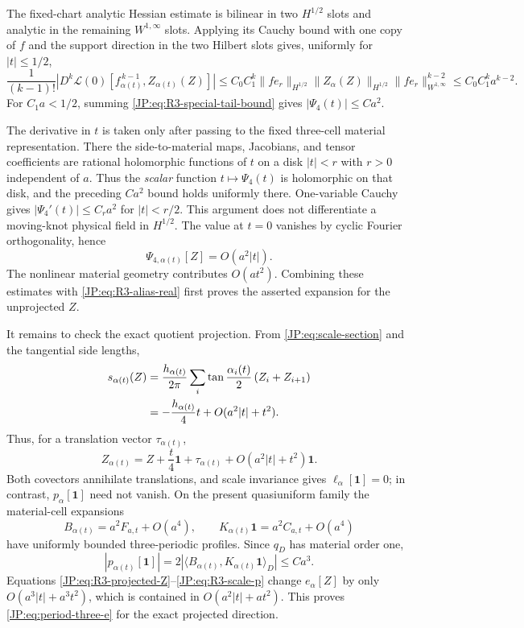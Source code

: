 \documentclass[11pt]{amsart}
\numberwithin{equation}{section}
\theoremstyle{definition}
\theoremstyle{remark}
\begin{document}
The fixed-chart analytic Hessian estimate is bilinear in two
$H^{1/2}$ slots and analytic in the remaining
$W^{1,\infty}$ slots.  Applying its Cauchy bound with one copy of $f$
and the support direction in the two Hilbert slots gives, uniformly for
$|t|\le1/2$,
\begin{equation}\label{JP:eq:R3-special-tail-bound}
 \frac1{(k-1)!}
 \left|D^k\mathcal L(0)
 [f_{\alpha(t)}^{\,k-1},Z_{\alpha(t)}(Z)]\right|
 \le C_0C_1^k
 \|f e_r\|_{H^{1/2}}\|Z_\alpha(Z)\|_{H^{1/2}}
 \|f e_r\|_{W^{1,\infty}}^{k-2}
 \le C_0C_1^k a^{k-2}.
\end{equation}
For $C_1a<1/2$, summing \eqref{JP:eq:R3-special-tail-bound} gives
$|\Psi_4(t)|\le Ca^2$.

The derivative in $t$ is taken only after passing to the fixed
three-cell material representation.  There the side-to-material maps,
Jacobians, and tensor coefficients are rational holomorphic functions of
$t$ on a disk $|t|<r$ with $r>0$ independent of $a$.  Thus the
\emph{scalar} function $t\mapsto\Psi_4(t)$ is holomorphic on that disk,
and the preceding $Ca^2$ bound holds uniformly there.  One-variable
Cauchy gives $|\Psi_4'(t)|\le C_ra^2$ for $|t|<r/2$.  This argument does
not differentiate a moving-knot physical field in $H^{1/2}$.
The value at $t=0$ vanishes by cyclic Fourier orthogonality, hence
\[
 \Psi_{4,\alpha(t)}[Z]=O(a^2|t|).
\]
The nonlinear material geometry contributes $O(at^2)$.  Combining these
estimates with \eqref{JP:eq:R3-alias-real} first proves the asserted
expansion for the unprojected $Z$.

It remains to check the exact quotient projection.  From
\eqref{JP:eq:scale-section} and the tangential side lengths,
\begin{align}
 s_{\alpha(t)}(Z)
 &=\frac{h_{\alpha(t)}}{2\pi}
 \sum_i\tan\frac{\alpha_i(t)}2\,(Z_i+Z_{i+1})\notag\\
 &=-\frac{h_{\alpha(t)}}4t+O(a^2|t|+t^2).
 \label{JP:eq:R3-scale-projection}
\end{align}
Thus, for a translation vector $\tau_{\alpha(t)}$,
\begin{equation}\label{JP:eq:R3-projected-Z}
 Z_{\alpha(t)}
 =Z+\frac t4\mathbf1+\tau_{\alpha(t)}
   +O(a^2|t|+t^2)\mathbf1.
\end{equation}
Both covectors annihilate translations, and scale invariance gives
$\ell_\alpha[\mathbf1]=0$; in contrast, $p_\alpha[\mathbf1]$ need not
vanish.  On the present quasiuniform family the material-cell expansions
\[
 B_{\alpha(t)}=a^2F_{a,t}+O(a^4),\qquad
 K_{\alpha(t)}\mathbf1=a^2C_{a,t}+O(a^4)
\]
have uniformly bounded three-periodic profiles.  Since $q_D$ has
material order one,
\begin{equation}\label{JP:eq:R3-scale-p}
 |p_{\alpha(t)}[\mathbf1]|
 =2|\langle B_{\alpha(t)},K_{\alpha(t)}\mathbf1\rangle_D|
 \le Ca^3.
\end{equation}
Equations \eqref{JP:eq:R3-projected-Z}--\eqref{JP:eq:R3-scale-p} change
$e_\alpha[Z]$ by only $O(a^3|t|+a^3t^2)$, which is contained in
$O(a^2|t|+at^2)$.  This proves \eqref{JP:eq:period-three-e} for the exact
projected direction.
\end{document}

